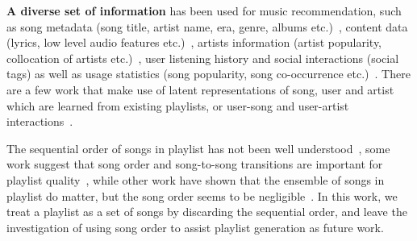 {\bf A diverse set of information} has been used for music recommendation,
such as song metadata (\eg song title, artist name, era, genre, albums etc.)~\cite{hariri2012context,platt2002learning},
content data (\eg lyrics, low level audio features etc.)~\cite{mcfee2011natural,mcfee2012hypergraph,jannach2015beyond,ben2017groove},
artists information (\eg artist popularity, collocation of artists etc.)~\cite{bonnin2013evaluating,ben2017groove},
user listening history and social interactions (\eg social tags) as well as usage statistics (\eg song popularity,
song co-occurrence etc.)~\cite{mcfee2012hypergraph,hariri2012context,bonnin2013evaluating,jannach2015beyond,ben2017groove}.
There are a few work that make use of latent representations of song, user and artist which are learned from existing playlists,
or user-song and user-artist interactions~\cite{chen2012playlist,ben2017groove}.

The sequential order of songs in playlist has not been well understood~\cite{schedl2017},
some work suggest that song order and song-to-song transitions are important
for playlist quality~\cite{mcfee2012hypergraph,kamehkhosh2018automated},
while other work have shown that the ensemble of songs in playlist do matter,
but the song order seems to be negligible~\cite{tintarev2017sequences,vall2017importance}.
In this work, we treat a playlist as a set of songs by discarding the sequential order,
and leave the investigation of using song order to assist playlist generation as future work.




%


